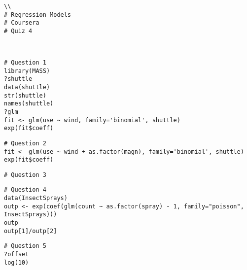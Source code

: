 \begin{frame}[fragile]
\begin{framed}
\begin{verbatim}\\
# Regression Models
# Coursera
# Quiz 4


\end{verbatim}
\end{framed}
\end{frame}
\begin{frame}[fragile]
\begin{framed}
\begin{verbatim}

# Question 1
library(MASS)
?shuttle
data(shuttle)
str(shuttle)
names(shuttle)
?glm
fit <- glm(use ~ wind, family='binomial', shuttle)
exp(fit$coeff)
\end{verbatim}
\end{framed}
\end{frame}
\begin{frame}[fragile]
\begin{framed}
\begin{verbatim}
# Question 2
fit <- glm(use ~ wind + as.factor(magn), family='binomial', shuttle)
exp(fit$coeff)
\end{verbatim}
\end{framed}
\end{frame}
\begin{frame}[fragile]
\begin{framed}
\begin{verbatim}
# Question 3

\end{verbatim}
\end{framed}
\end{frame}
\begin{frame}[fragile]
\begin{framed}
\begin{verbatim}
# Question 4
data(InsectSprays)
outp <- exp(coef(glm(count ~ as.factor(spray) - 1, family="poisson", InsectSprays)))
outp
outp[1]/outp[2]
\end{verbatim}
\end{framed}
\end{frame}
\begin{frame}[fragile]
\begin{framed}
\begin{verbatim}
# Question 5
?offset
log(10)
\end{verbatim}
\end{framed}
\end{frame}
